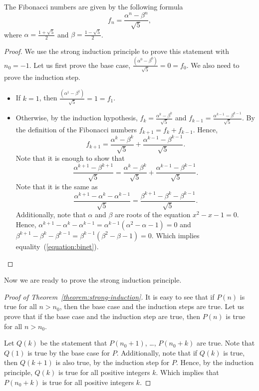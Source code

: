 \begin{theorem}
  The Fibonacci numbers are given by the following formula
  \[
      f_n = \frac{\alpha^n - \beta^n}{\sqrt{5}},
  \]
  where $\alpha = \frac{1 + \sqrt{5}}{2}$ and
  $\beta = \frac{1 - \sqrt{5}}{2}$.
\end{theorem}
\begin{proof}
  We use the strong induction principle to prove this statement with $n_0 = -1$.
  Let us first prove the base case,
  $\frac{(\alpha^0 - \beta^0)}{\sqrt{5}} = 0 = f_0$.
  We also need to prove the induction step.
  \begin{itemize}
    \item If $k = 1$, then $\frac{(\alpha^1 - \beta^1)}{\sqrt{5}} = 1 = f_1$.
    \item Otherwise, by the induction hypothesis,
      $f_k = \frac{\alpha^k - \beta^k}{\sqrt{5}}$ and
      $f_{k - 1} = \frac{\alpha^{k - 1} - \beta^{k - 1}}{\sqrt{5}}$.
      By the definition of the Fibonacci numbers $f_{k + 1} = f_k + f_{k - 1}$.
      Hence,
      \[
        f_{k + 1} = \frac{\alpha^k - \beta^k}{\sqrt{5}} +
        \frac{\alpha^{k - 1} - \beta^{k - 1}}{\sqrt{5}}.
      \]
      Note that it is enough to show that
      \begin{equation}
      \label{equation:binet}
        \frac{\alpha^{k + 1} - \beta^{k + 1}}{\sqrt{5}} =
        \frac{\alpha^k - \beta^k}{\sqrt{5}} +
        \frac{\alpha^{k - 1} - \beta^{k - 1}}{\sqrt{5}}.
      \end{equation}
      Note that it is the same as
      \[
        \frac{\alpha^{k + 1} - \alpha^k - \alpha^{k - 1}}{\sqrt{5}} =
        \frac{\beta^{k + 1} - \beta^k - \beta^{k - 1}}{\sqrt{5}}.
      \]
      Additionally, note that $\alpha$ and $\beta$ are roots of the equation
      $x^2 - x - 1 = 0$. Hence,
      $\alpha^{k + 1} - \alpha^k - \alpha^{k - 1} = \alpha^{k - 1}(\alpha^2 -
      \alpha - 1) = 0$ and
      $\beta^{k + 1} - \beta^k - \beta^{k - 1} =
      \beta^{k - 1}(\beta^2 - \beta - 1) = 0$. Which implies
      equality~(\ref{equation:binet}).
  \end{itemize}
\end{proof}

Now we are ready to prove the strong induction principle.
\begin{proof}[Proof of Theorem~\ref{theorem:strong-induction}]
  It is easy to see that if $P(n)$ is true for all $n > n_0$, then the base
  case and the induction steps are true. Let us prove that if the base case and
  the induction step are true, then $P(n)$ is true for all $n > n_0$.

  Let $Q(k)$ be the statement that $P(n_0 + 1)$, \dots, $P(n_0 + k)$ are true.
  Note that $Q(1)$ is true by the base case for $P$. Additionally, note that if
  $Q(k)$ is true, then $Q(k + 1)$ is also true, by the induction step for $P$.
  Hence, by the induction principle, $Q(k)$ is true for all positive integers
  $k$. Which implies that $P(n_0 + k)$ is true for all positive integers $k$.
\end{proof}


